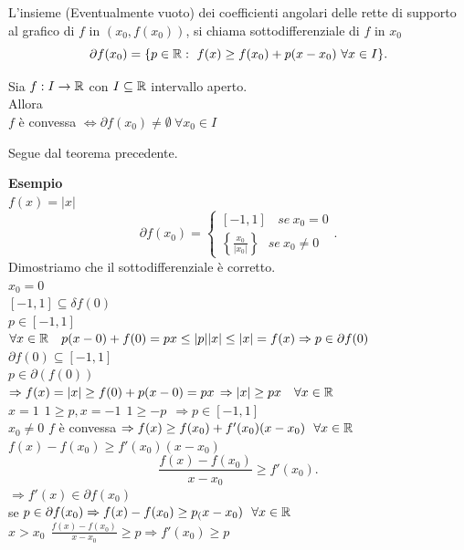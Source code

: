 \documentclass[12px]{article}
\begin{document}
	\begin{defi}
	L'insieme (Eventualmente vuoto) dei coefficienti angolari delle rette di supporto al grafico di $f$ in $(x_0, f(x_0))$, si chiama sottodifferenziale di $f$ in $x_0$
	\[
		\partial f(x_0) = \{p\in \mathbb{R} : \ f(x)\geq f(x_0) + p(x-x_0)\ \forall x\in I\}
	.\] 
\end{defi}
\begin{teo}
	Sia $f :I \rightarrow \mathbb{R}$ con $I\subseteq \mathbb{R}$ intervallo aperto.\\
	Allora\\
	$f$ è convessa $ \Leftrightarrow \partial f(x_0)\neq \emptyset\ \forall x_0\in I$
\end{teo}
\begin{dimo}
	Segue dal teorema precedente.
\end{dimo}
\textbf{Esempio}\\
$f(x) = |x|$
 \[
\partial f(x_0) = \begin{cases}
	[-1,1] \ \ \ \ se  \ x_0 = 0\\
	\left\{\frac{x_0}{|x_0|}\right\} \ \ \ se \ x_0\neq 0
\end{cases}
.\] 
Dimostriamo che il sottodifferenziale è corretto.\\
$x_0 = 0$\\
$[-1,1] \subseteq \delta f(0)$\\
$p\in [-1,1]$\\
 $\forall x\in \mathbb{R} \ \ \ p(x-0) + f(0) = px\leq |p||x|\leq |x| = f(x) \Rightarrow p\in \partial f(0)$ \\
 $\partial f(0)\subseteq [-1,1]$\\
  $p\in \partial(f(0))$\\
  $ \Rightarrow  f(x) = |x| \geq f(0) + p(x-0) = px\\$
  $ \Rightarrow  |x|\geq px \ \ \ \forall x\in \R$ \\
  $x = 1 \ \ 1\geq p, x= -1\ \ 1\geq -p \ \ \Rightarrow  p\in[-1,1]$ \\
  $x_0\neq 0$ $f$ è convessa $ \Rightarrow f(x)\geq f(x_0) + f'(x_0)(x-x_0)\ \ \forall x\in \mathbb{R}$\\
  $f(x) - f(x_0) \geq f'(x_0)(x-x_0)$\\
  \[
	  \frac{f(x)-f(x_0)}{x-x_0}\geq f'(x_0)
  .\] 
  $ \Rightarrow  f'(x)\in \partial f(x_0)$ \\
  se  $p\in \partial f(x_0) \Rightarrow f(x)-f(x_0)\geq p_(x-x_0)\ \ \forall x\in \mathbb{R}$ \\
  $x > x_0\ \ \frac{f(x)-f(x_0)}{x-x_0}\geq p \Rightarrow f'(x_0)\geq p$ \\
\end{document}
